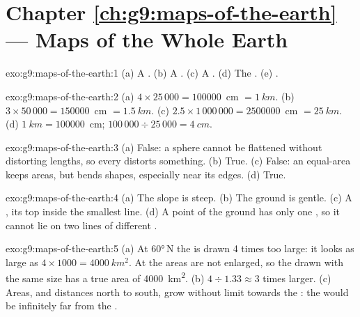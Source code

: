 \section*{Chapter \ref{ch:g9:maps-of-the-earth} --- Maps of the Whole Earth}

\begin{solution}{exo:g9:maps-of-the-earth:1}
(a) A . (b) A . (c) A . (d) The
. (e) .
\end{solution}

\begin{solution}{exo:g9:maps-of-the-earth:2}
(a) $4 \times 25\,000 = \num{100000}$~cm $= \qty{1}{km}$. (b) $3 \times
50\,000 = \num{150000}$~cm $= \qty{1.5}{km}$. (c) $2.5 \times 1\,000\,000
= \num{2500000}$~cm $= \qty{25}{km}$. (d) $\qty{1}{km} = \num{100000}$~cm;
$100\,000 \div 25\,000 = \qty{4}{cm}$.
\end{solution}

\begin{solution}{exo:g9:maps-of-the-earth:3}
(a) False: a sphere cannot be flattened without distorting lengths, so
every  distorts something. (b) True. (c) False: an equal-area 
keeps areas, but bends shapes, especially near its edges. (d) True.
\end{solution}

\begin{solution}{exo:g9:maps-of-the-earth:4}
(a) The slope is steep. (b) The ground is gentle. (c) A , its top
inside the smallest line. (d) A point of the ground has only one ,
so it cannot lie on two lines of different .
\end{solution}

\begin{solution}{exo:g9:maps-of-the-earth:5}
(a) At \ang{60}\,N the  is drawn 4 times too large: it looks as large as
$4 \times 1000 = \qty{4000}{km^2}$. At the  areas are not enlarged, so the
 drawn with the same size has a true area of \qty{4000}{km^2}.
(b) $4 \div 1.33 \approx 3$ times larger. (c) Areas, and distances north
to south, grow without limit towards the : the  would be
infinitely far from the .
\end{solution}

